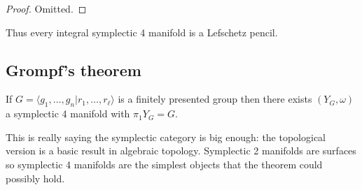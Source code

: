\documentclass[a4paper]{article}
\begin{document}
\begin{proof}
  Omitted.
\end{proof}

Thus every integral symplectic 4 manifold is a Lefschetz pencil.

\subsection{Grompf's theorem}

\begin{theorem}[Grompf]
  If \(G = \langle g_1, \dots, g_n | r_1, \dots, r_\ell \rangle\) is a finitely presented group then there exists \((Y_G, \omega)\) a symplectic 4 manifold with \(\pi_1 Y_G = G\).
\end{theorem}

This is really saying the symplectic category is big enough: the topological version is a basic result in algebraic topology. Symplectic 2 manifolds are surfaces so symplectic 4 manifolds are the simplest objects that the theorem could possibly hold.
\end{document}
